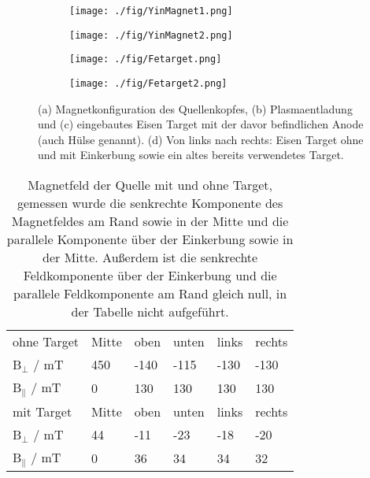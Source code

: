 \begin{figure}
    \centering
    \begin{subfigure}{0.33\textwidth}
        \texttt{[image: ./fig/YinMagnet1.png]}
        \caption{}
        \label{fig:magnet}
    \end{subfigure}
    \begin{subfigure}{0.33\textwidth}
        \texttt{[image: ./fig/YinMagnet2.png]}
        \caption{}
        \label{fig:plasma}
    \end{subfigure}
    \begin{subfigure}{0.30\textwidth}
        \texttt{[image: ./fig/Fetarget.png]}
        \caption{}
        \label{fig:target1}
    \end{subfigure}
    \begin{subfigure}{1\textwidth}
        \texttt{[image: ./fig/Fetarget2.png]}
        \caption{}
        \label{fig:target2}
    \end{subfigure}
    \caption{(a) Magnetkonfiguration des Quellenkopfes, (b) Plasmaentladung \cite{Yin.2007} und (c) eingebautes Eisen Target mit der davor befindlichen Anode (auch Hülse genannt). (d) Von links nach rechts: Eisen Target ohne und mit Einkerbung sowie ein altes bereits verwendetes Target.}
    \label{fig:target}
\end{figure}

\begin{table}
    \centering
    \caption{Magnetfeld der Quelle mit und ohne Target, gemessen wurde die senkrechte Komponente des Magnetfeldes am Rand sowie in der Mitte und die parallele Komponente über der Einkerbung sowie in der Mitte. Außerdem ist die senkrechte Feldkomponente über der Einkerbung und die parallele Feldkomponente am Rand gleich null, in der Tabelle nicht aufgeführt.}
    \label{tab:bfeld}
    \begin{tabular}{l|lllll}
        \toprule
        ohne Target	&	Mitte	&	oben	&	unten	&  links & rechts\\
        B$_{\bot}$ / mT   & 450 &-140 & -115& -130& -130 \\
        B$_{\parallel}$ / mT   & 0 &130 & 130& 130& 130 \\    
        \midrule
        mit Target	&	Mitte	&	oben	&	unten	&  links & rechts\\
        B$_{\bot}$ / mT   & 44 &-11 & -23& -18& -20 \\
        B$_{\parallel}$ / mT   & 0 &36 & 34& 34& 32 \\      
       \bottomrule
    \end{tabular}
\end{table}

